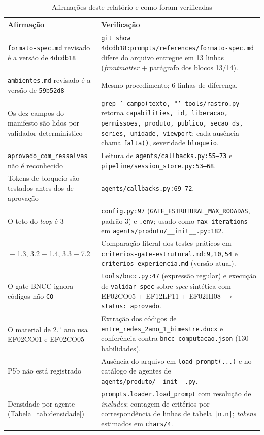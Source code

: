 \documentclass[11pt,a4paper]{article}
\newcommand{\cod}[1]{\texttt{\small #1}}
\begin{document}
\begin{longtable}{p{4.6cm}p{10.2cm}}
\caption{Afirmações deste relatório e como foram verificadas}\\
\toprule
\textbf{Afirmação} & \textbf{Verificação} \\
\midrule
\endfirsthead
\cod{formato-spec.md} revisado é a versão de \cod{4dcdb18} &
\cod{git show 4dcdb18:prompts/references/formato-spec.md} difere do arquivo entregue em 13 linhas
(\textit{frontmatter} + parágrafo dos blocos 13/14). \\
\addlinespace
\cod{ambientes.md} revisado é a versão de \cod{59b52d8} & Mesmo procedimento; 6 linhas de diferença. \\
\addlinespace
Os dez campos do manifesto são lidos por validador determinístico &
\cod{grep '\_campo(texto, "' tools/rastro.py} retorna \cod{capabilities, id, liberacao, permissoes,
produto, publico, secao\_ds, series, unidade, viewport}; cada ausência chama \cod{falta()}, severidade
\cod{bloqueio}. \\
\addlinespace
\cod{aprovado\_com\_ressalvas} não é reconhecido &
Leitura de \cod{agents/callbacks.py:55--73} e \cod{pipeline/session\_store.py:53--68}. \\
\addlinespace
Tokens de bloqueio são testados antes dos de aprovação &
\cod{agents/callbacks.py:69--72}. \\
\addlinespace
O teto do \textit{loop} é 3 &
\cod{config.py:97} (\cod{GATE\_ESTRUTURAL\_MAX\_RODADAS}, padrão 3) e \cod{.env}; usado como
\cod{max\_iterations} em \cod{agents/produto/\_\_init\_\_.py:182}. \\
\addlinespace
3.1$\equiv$1.3, 3.2$\equiv$1.4, 3.3$\equiv$7.2 &
Comparação literal dos testes práticos em \cod{criterios-gate-estrutural.md:9,10,54} e
\cod{criterios-experiencia.md} (versão atual). \\
\addlinespace
O gate BNCC ignora códigos não-\cod{CO} &
\cod{tools/bncc.py:47} (expressão regular) e execução de \cod{validar\_spec} sobre \textit{spec} sintética
com EF02CO05 + EF12LP11 + EF02HI08 $\rightarrow$ \cod{status: aprovado}. \\
\addlinespace
O material de 2.\textsuperscript{o} ano usa EF02CO01 e EF02CO05 &
Extração dos códigos de \cod{entre\_redes\_2ano\_1\_bimestre.docx} e conferência contra
\cod{bncc-computacao.json} (130 habilidades). \\
\addlinespace
P5b não está registrado &
Ausência do arquivo em \cod{load\_prompt(...)} e no catálogo de agentes de
\cod{agents/produto/\_\_init\_\_.py}. \\
\addlinespace
Densidade por agente (Tabela~\ref{tab:densidade}) &
\cod{prompts.loader.load\_prompt} com resolução de \textit{includes}; contagem de critérios por
correspondência de linhas de tabela \cod{|n.n|}; \textit{tokens} estimados em \cod{chars/4}. \\
\bottomrule
\end{longtable}
\end{document}
